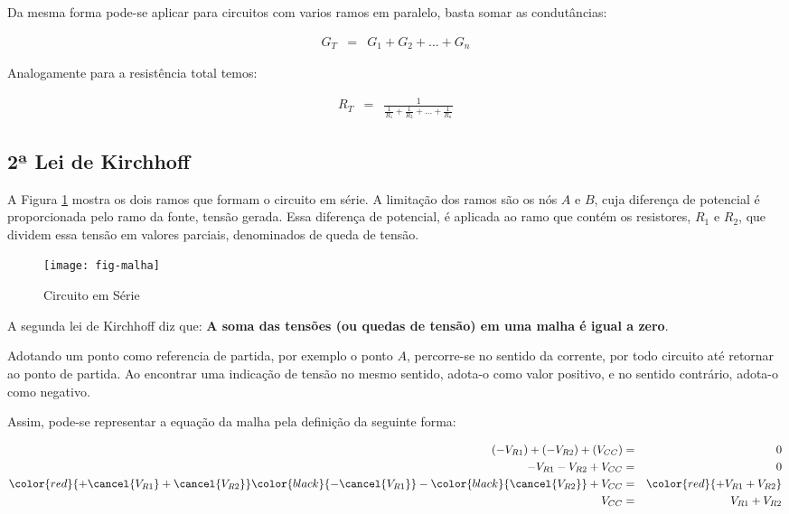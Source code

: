 Da mesma forma pode-se aplicar para circuitos com varios ramos em paralelo, basta somar as condutâncias:

\begin{eqnarray}
	G_T & = & G_1 + G_2 + ... + G_n
\end{eqnarray}

Analogamente para a resistência total temos:

\begin{eqnarray}
	R_T & = & \frac{1}{\frac{1}{R_1} + \frac{1}{R_2} + ... + \frac{1}{R_n} }
\end{eqnarray}











\subsection{2ª Lei de Kirchhoff}

A Figura \ref{fig:malha} mostra os dois ramos que formam o circuito em série.
A limitação dos ramos são os nós $A$ e $B$, cuja diferença de potencial é proporcionada pelo ramo da fonte, tensão gerada. Essa diferença de potencial, é aplicada ao ramo que contém os resistores, $R_1$ e $R_2$, que dividem essa tensão em valores parciais, denominados de queda de tensão.

\begin{figure}[!h]
	\centering
	\caption{Circuito em Série}
	\texttt{[image: fig-malha]}
	\label{fig:malha}
\end{figure}

A segunda lei de Kirchhoff diz que: \textbf{A soma das tensões (ou quedas de tensão) em uma malha é igual a zero}.

Adotando um ponto como referencia de partida, por exemplo o ponto $A$, percorre-se no sentido da corrente, por todo circuito até retornar ao ponto de partida. Ao encontrar uma indicação de tensão no mesmo sentido, adota-o como valor positivo, e no sentido contrário, adota-o como negativo.

Assim, pode-se representar a equação da malha pela definição da seguinte forma:

\begin{eqnarray}
	(-V_{R1}) + (-V_{R2}) + (V_{CC})  & = & 0 \\
	-V_{R1} - V_{R2} + V_{CC} & = & 0 \nonumber\\
	\color{red}{ + \cancel{ V_{R1} } + \cancel{ V_{R2} } } \color{black}{- \cancel{V_{R1}} } - \color{black}{\cancel{ V_{R2}} } + V_{CC} & = & \color{red}{+ V_{R1} + V_{R2}} \nonumber\\
	 V_{CC} & = & V_{R1} + V_{R2}
\end{eqnarray}


